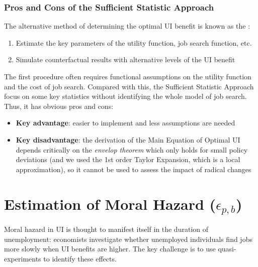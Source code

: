         \subsubsection{Pros and Cons of the Sufficient Statistic Approach}
            The alternative method of determining the optimal UI benefit is known as the :
            \begin{enumerate}
                \item Estimate the key parameters of the utility function, job search function, etc.
                \item Simulate counterfactual results with alternative levels of the UI benefit
            \end{enumerate}
            The first procedure often requires functional assumptions on the utility function and the cost of job search. Compared with this, the Sufficient Statistic Approach focus on some key statistics without identifying the whole model of job search. Thus, it has obvious pros and cons:
            \begin{itemize}
                \item \textbf{Key advantage}: easier to implement and less assumptions are needed
                \item \textbf{Key disadvantage}: the derivation of the Main Equation of Optimal UI depends critically on the \emph{envelop theorem} which only holds for small policy deviations (and we used the 1st order Taylor Expansion, which is a local approximation), so it cannot be used to assess the impact of radical changes
            \end{itemize}

\section{Estimation of Moral Hazard ($\epsilon_{p,b}$)}
    Moral hazard in UI is thought to manifest itself in the duration of unemployment: economists investigate whether unemployed individuals find jobs more slowly when UI benefits are higher. The key challenge is to use quasi-experiments to identify these effects.
    
